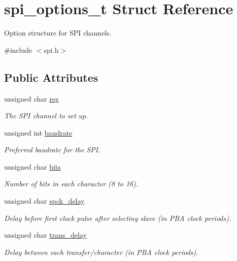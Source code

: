 \hypertarget{structspi__options__t}{}\section{spi\+\_\+options\+\_\+t Struct Reference}
\label{structspi__options__t}


Option structure for S\+PI channels.  




{\ttfamily \#include $<$spi.\+h$>$}

\subsection*{Public Attributes}
\begin{DoxyCompactItemize}
\item 
unsigned char \hyperlink{structspi__options__t_a1e6dfa9b370d7e4f0b4e8d6cb75835a5}{reg}
\begin{DoxyCompactList}\small\item\em The S\+PI channel to set up. \end{DoxyCompactList}\item 
unsigned int \hyperlink{structspi__options__t_a68bf86b07a5c69d257ae8d4a9c307b9e}{baudrate}
\begin{DoxyCompactList}\small\item\em Preferred baudrate for the S\+PI. \end{DoxyCompactList}\item 
unsigned char \hyperlink{structspi__options__t_afdd53dbfebb4b94e95fa18a8e3037c65}{bits}
\begin{DoxyCompactList}\small\item\em Number of bits in each character (8 to 16). \end{DoxyCompactList}\item 
unsigned char \hyperlink{structspi__options__t_aa9434f07d440208f42f817cb977f6a52}{spck\+\_\+delay}
\begin{DoxyCompactList}\small\item\em Delay before first clock pulse after selecting slave (in P\+BA clock periods). \end{DoxyCompactList}\item 
unsigned char \hyperlink{structspi__options__t_aee521fc57eda6597539edb8d4dff56eb}{trans\+\_\+delay}
\begin{DoxyCompactList}\small\item\em Delay between each transfer/character (in P\+BA clock periods). \end{DoxyCompactList}\item 

\end{DoxyCompactItemize}
